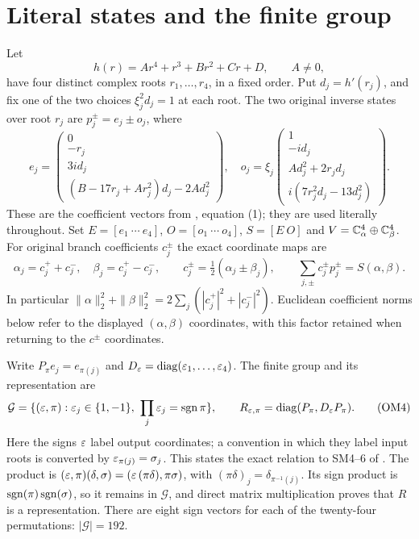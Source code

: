 \documentclass[11pt]{article}
\begin{document}
\section{Literal states and the finite group}
Let
\[
 h(r)=Ar^4+r^3+Br^2+Cr+D,\qquad A\ne0,
 \tag{OM1}
\]
have four distinct complex roots $r_1,\ldots,r_4$, in a fixed order.
Put $d_j=h'(r_j)$, and fix one of the two choices
$\xi_j^2d_j=1$ at each root.  The two original inverse states over
root $r_j$ are $p_j^\pm=e_j\pm o_j$, where
\[
e_j=\begin{pmatrix}
0\\-r_j\\3id_j\\(B-17r_j+Ar_j^2)d_j-2Ad_j^2
\end{pmatrix},\quad
o_j=\xi_j\begin{pmatrix}
1\\-id_j\\Ad_j^2+2r_jd_j\\i(7r_j^2d_j-13d_j^2)
\end{pmatrix}.
\tag{OM2}
\]
These are the coefficient vectors from \cite{sforbit:Incoming}, equation (1);
they are used literally throughout.  Set $E=[e_1\ \cdots\ e_4]$,
$O=[o_1\ \cdots\ o_4]$, $S=[E\ O]$ and
$V=\mathbb C^4_\alpha\oplus\mathbb C^4_\beta$.  For original branch coefficients
$c_j^\pm$ the exact coordinate maps are
\[
\alpha_j=c_j^++c_j^-,\quad \beta_j=c_j^+-c_j^-,
\qquad c_j^\pm=\tfrac12(\alpha_j\pm\beta_j),
\qquad \sum_{j,\pm}c_j^\pm p_j^\pm=S(\alpha,\beta).
\tag{OM3}
\]
In particular $\|\alpha\|_2^2+\|\beta\|_2^2=
2\sum_j(|c_j^+|^2+|c_j^-|^2)$.  Euclidean coefficient norms below
refer to the displayed $(\alpha,\beta)$ coordinates, with this factor
retained when returning to the $c^\pm$ coordinates.

Write $P_\pi e_j=e_{\pi(j)}$ and $D_\varepsilon=\operatorname{diag}(\varepsilon_1,\ldots,\varepsilon_4)$.
The finite group and its representation are
\[
\mathcal G=\{(\varepsilon,\pi):\varepsilon_j\in\{1,-1\},
       \ \prod_j\varepsilon_j=\operatorname{sgn}\pi\},\qquad
R_{\varepsilon,\pi}=\operatorname{diag}(P_\pi,D_\varepsilon P_\pi).
\tag{OM4}
\]
Here the signs $\varepsilon$ label output coordinates; a convention in which
they label input roots is converted by $\varepsilon_{\pi(j)}=\sigma_j$.
This states the exact relation to SM4--6 of \cite{sforbit:Fable}.
The product is
$(\varepsilon,\pi)(\delta,\sigma)=(\varepsilon\,(\pi\delta),\pi\sigma)$, with
$(\pi\delta)_j=\delta_{\pi^{-1}(j)}$.  Its sign product is
$\operatorname{sgn}(\pi)\operatorname{sgn}(\sigma)$, so it remains in $\mathcal G$, and direct
matrix multiplication proves that $R$ is a representation.  There
are eight sign vectors for each of the twenty-four permutations:
$|\mathcal G|=192$.
\end{document}
